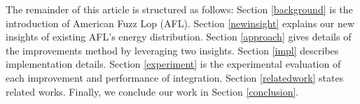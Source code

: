 The remainder of this article is structured as follows: Section \ref{background} is the introduction of American Fuzz Lop (AFL). Section \ref{newinsight} explains our new insights of existing AFL's energy distribution.  Section \ref{approach} gives details of the improvements method by leveraging two insights. Section \ref{impl} describes implementation details. Section \ref{experiment} is the experimental evaluation of each improvement and performance of integration. Section \ref{relatedwork} states related works. Finally, we conclude our work in Section \ref{conclusion}. 







